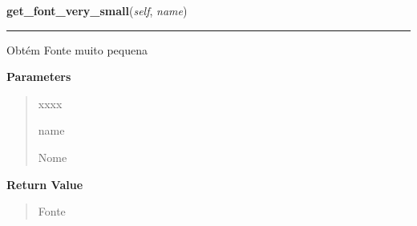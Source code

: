 \hspace{.8\funcindent}\begin{boxedminipage}{\funcwidth}

    \raggedright \textbf{get\_font\_very\_small}(\textit{self}, \textit{name})

    \vspace{-1.5ex}

    \rule{\textwidth}{0.5\fboxrule}
\setlength{\parskip}{2ex}
    Obtém Fonte muito pequena

\setlength{\parskip}{1ex}
      \textbf{Parameters}
      \vspace{-1ex}

      \begin{quote}
        \begin{Ventry}{xxxx}

          \item[name]

          Nome

        \end{Ventry}

      \end{quote}

      \textbf{Return Value}
    \vspace{-1ex}

      \begin{quote}
      Fonte

      \end{quote}

    \end{boxedminipage}

    \label{pygame-asteroids:resource_manager:ResourceManager:get_image}

    \vspace{0.5ex}

